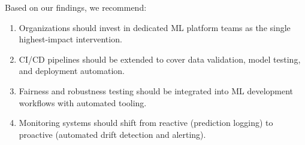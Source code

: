 \documentclass[
    language=english,
    doctype=survey-report,
    institution=none,
]{../../omnilatex}
\begin{document}
Based on our findings, we recommend:
\begin{enumerate}
    \item Organizations should invest in dedicated ML platform teams as
          the single highest-impact intervention.
    \item CI/CD pipelines should be extended to cover data validation,
          model testing, and deployment automation.
    \item Fairness and robustness testing should be integrated into ML
          development workflows with automated tooling.
    \item Monitoring systems should shift from reactive (prediction
          logging) to proactive (automated drift detection and alerting).
\end{enumerate}



\end{document}
